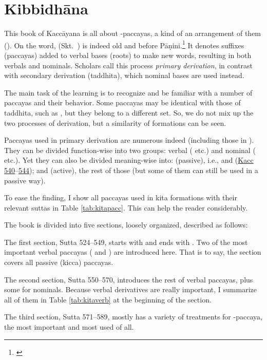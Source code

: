 \chapter{Kibbidhāna}

This book of Kaccāyana is all about -paccayas, a kind of an arrangement of them (). On the word,  (Skt.\ ) is indeed old and before Pāṇini.\footnote{\citealp[p.~126]{abhyankar:gramdict}} It denotes suffixes (paccayas) added to verbal bases (roots) to make new words, resulting in both verbals and nominals. Scholars call this process \emph{primary derivation}, in contrast with secondary derivation (taddhita), which nominal bases are used instead.

The main task of the learning is to recognize and be familiar with a number of paccayas and their behavior. Some paccayas may be identical with those of taddhita, such as , but they belong to a different set. So, we do not mix up the two processes of derivation, but a similarity of formations can be seen.

Paccayas used in primary derivation are numerous indeed (including those in ). They can be divided function-wise into two groups: verbal ( etc.) and nominal ( etc.). Yet they can also be divided meaning-wise into: \hyperref[sut:545]{} (passive), i.e.,  and  (\hyperref[sut:540]{Kacc 540}--\hyperref[sut:544]{544}); and \hyperref[sut:546]{} (active), the rest of those (but some of them can still be used in a passive way).

To ease the finding, I show all paccayas used in kita formations with their relevant suttas in Table \ref{tab:kitapacc}. This can help the reader considerably.

The book is divided into five sections, loosely organized, described as follows:

The first section, Sutta 524--549, starts with  and ends with . Two of the most important verbal paccayas ( and ) are introduced here. That is to say, the section covers all passive (kicca) paccayas.

The second section, Sutta 550--570, introduces the rest of verbal paccayas, plus some for nominals. Because verbal derivatives are really important, I summarize all of them in Table \ref{tab:kitaverb} at the beginning of the section.

The third section, Sutta 571--589, mostly has a variety of treatments for -paccaya, the most important and most used of all.

